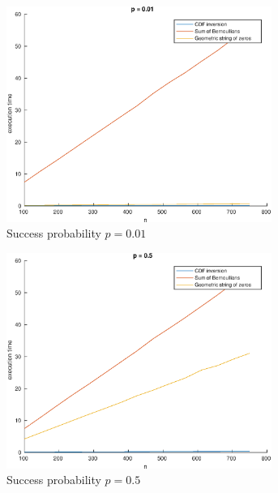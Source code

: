 \documentclass[a4paper,oneside]{article}
\begin{document}
\begin{figure}[htbp]
  \centering
  \begin{subfigure}{0.5\textwidth}
    \centering
    \includegraphics[width=0.95\textwidth]{binomial_gen_1}
    \caption{Success probability $p=0.01$}
    \label{plot:binomial_1}
  \end{subfigure}%
  \begin{subfigure}{0.5\textwidth}
    \centering
    \includegraphics[width=0.95\textwidth]{binomial_gen_2}
    \caption{Success probability $p=0.5$}
    \label{plot:binomial_2}
  \end{subfigure}
  \begin{subfigure}{0.5\textwidth}

\end{subfigure}
\end{figure}
\end{document}
